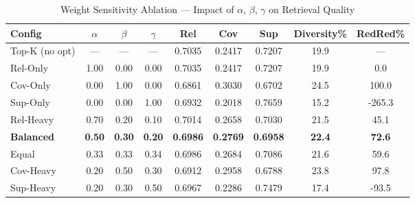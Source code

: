 \begin{table}[htbp]
\centering
\caption{Weight Sensitivity Ablation — Impact of $\alpha$, $\beta$, $\gamma$ on Retrieval Quality}
\label{tab:weight_ablation}
\begin{tabular}{l c c c | c c c | c c}
\hline
\textbf{Config} & $\alpha$ & $\beta$ & $\gamma$ & \textbf{Rel} & \textbf{Cov} & \textbf{Sup} & \textbf{Diversity\%} & \textbf{RedRed\%} \\
\hline
Top-K (no opt) & — & — & — & 0.7035 & 0.2417 & 0.7207 & 19.9 & — \\
Rel-Only & 1.00 & 0.00 & 0.00 & 0.7035 & 0.2417 & 0.7207 & 19.9 & 0.0 \\
Cov-Only & 0.00 & 1.00 & 0.00 & 0.6861 & 0.3030 & 0.6702 & 24.5 & 100.0 \\
Sup-Only & 0.00 & 0.00 & 1.00 & 0.6932 & 0.2018 & 0.7659 & 15.2 & -265.3 \\
Rel-Heavy & 0.70 & 0.20 & 0.10 & 0.7014 & 0.2658 & 0.7030 & 21.5 & 45.1 \\
\textbf{Balanced} & \textbf{0.50} & \textbf{0.30} & \textbf{0.20} & \textbf{0.6986} & \textbf{0.2769} & \textbf{0.6958} & \textbf{22.4} & \textbf{72.6} \\
Equal & 0.33 & 0.33 & 0.34 & 0.6986 & 0.2684 & 0.7086 & 21.6 & 59.6 \\
Cov-Heavy & 0.20 & 0.50 & 0.30 & 0.6912 & 0.2958 & 0.6788 & 23.8 & 97.8 \\
Sup-Heavy & 0.20 & 0.30 & 0.50 & 0.6967 & 0.2286 & 0.7479 & 17.4 & -93.5 \\
\hline
\end{tabular}
\end{table}